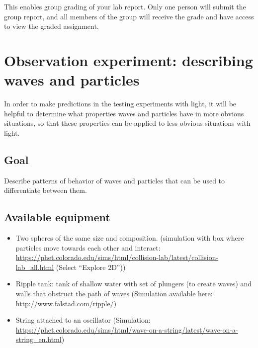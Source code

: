 This enables group grading of your lab report. Only one person will submit the group report, and all members of the group will receive the grade and have access to view the graded assignment.

\section{Observation experiment: describing waves and particles}

In order to make predictions in the testing experiments with light, it will be helpful to determine what properties waves and particles have in more obvious situations, so that these properties can be applied to less obvious situations with light.

\subsection{Goal}

Describe patterns of behavior of waves and particles that can be used to differentiate between them.




\subsection{Available equipment}

\begin{itemize}
	\item Two spheres of the same size and composition. (simulation with box where particles move towards each other and interact:  \url{https://phet.colorado.edu/sims/html/collision-lab/latest/collision-lab_all.html} (Select ``Explore 2D''))

	\item Ripple tank: tank of shallow water with set of plungers (to create waves) and walls that obstruct the path of waves (Simulation available here: \url{http://www.falstad.com/ripple/})
	
	\item String attached to an oscillator (Simulation: \url{https://phet.colorado.edu/sims/html/wave-on-a-string/latest/wave-on-a-string_en.html})
\end{itemize}

